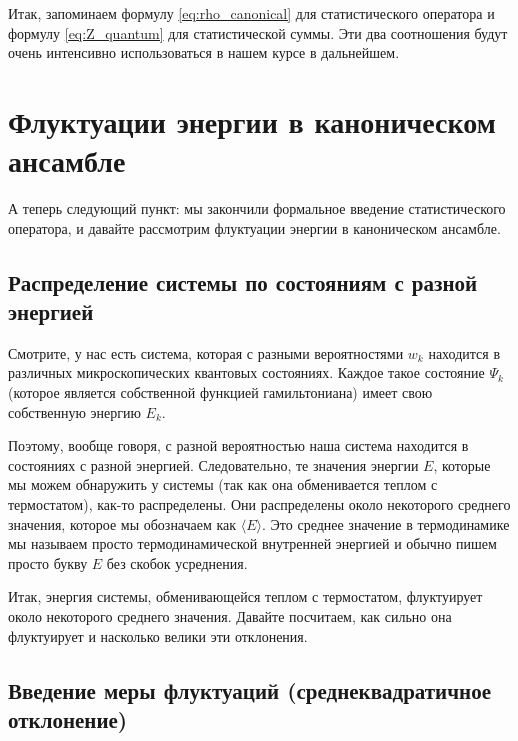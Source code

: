\documentclass[../general/general]{subfiles}
\begin{document}
Итак, запоминаем формулу \eqref{eq:rho_canonical} для статистического оператора и формулу \eqref{eq:Z_quantum} для статистической суммы. Эти два соотношения будут очень интенсивно использоваться в нашем курсе в дальнейшем.



\section{Флуктуации энергии в каноническом ансамбле}

А теперь следующий пункт: мы закончили формальное введение статистического оператора, и давайте рассмотрим флуктуации энергии в каноническом ансамбле. 

\subsection{Распределение системы по состояниям с разной энергией}

Смотрите, у нас есть система, которая с разными вероятностями $w_k$ находится в различных микроскопических квантовых состояниях. Каждое такое состояние $\Psi_k$ (которое является собственной функцией гамильтониана) имеет свою собственную энергию $E_k$. 

Поэтому, вообще говоря, с разной вероятностью наша система находится в состояниях с разной энергией. Следовательно, те значения энергии $E$, которые мы можем обнаружить у системы (так как она обменивается теплом с термостатом), как-то распределены. Они распределены около некоторого среднего значения, которое мы обозначаем как $\langle E \rangle$. Это среднее значение в термодинамике мы называем просто термодинамической внутренней энергией и обычно пишем просто букву $E$ без скобок усреднения.

Итак, энергия системы, обменивающейся теплом с термостатом, флуктуирует около некоторого среднего значения. Давайте посчитаем, как сильно она флуктуирует и насколько велики эти отклонения.

\subsection{Введение меры флуктуаций (среднеквадратичное отклонение)}
\end{document}
